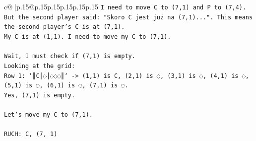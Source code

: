 \documentclass{article}
\begin{document}
{\begin{supertabular}{c@{$\;$}|p{.15\linewidth}@{}p{.15\linewidth}p{.15\linewidth}p{.15\linewidth}p{.15\linewidth}p{.15\linewidth}}
{{{\texttt{I need to move C to (7,1) and P to (7,4).} \\
\texttt{But the second player said: "Skoro C jest już na (7,1)...". This means the second player's C is at (7,1).} \\
\texttt{My C is at (1,1). I need to move my C to (7,1).} \\
\\ 
\texttt{Wait, I must check if (7,1) is empty.} \\
\texttt{Looking at the grid:} \\
\texttt{Row 1: `║C│◌│◌◌◌║` {-}> (1,1) is C, (2,1) is ◌, (3,1) is ◌, (4,1) is ◌, (5,1) is ◌, (6,1) is ◌, (7,1) is ◌.} \\
\texttt{Yes, (7,1) is empty.} \\
\\ 
\texttt{Let's move my C to (7,1).} \\
\\ 
\texttt{RUCH: C, (7, 1)} \\
            }
        }
    }
     \\ \\


\end{supertabular}}
\end{document}
